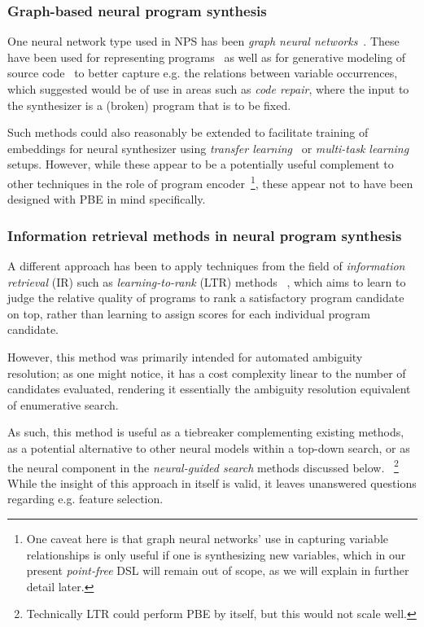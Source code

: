 \documentclass{article}
\begin{document}
\subsubsection{Graph-based neural program synthesis}

One neural network type used in NPS has been
\emph{graph neural networks}~\citep{shuman2013emerging,wu2020comprehensive}.
These have been used for representing programs~\citep{allamanis2017learning}
as well as for generative modeling of source code~\citep{brockschmidt2018generative}%
to better capture e.g. the relations between variable occurrences,
which \citet{brockschmidt2018generative} suggested would be of use in areas such as \emph{code repair},
where the input to the synthesizer is a (broken) program that is to be fixed.

Such methods could also reasonably be extended to facilitate training of embeddings for neural synthesizer using \emph{transfer learning}~\citep{pan2009survey} or \emph{multi-task learning}~\citep{multitasklearning} setups.
However, while these appear to be a potentially useful complement to other techniques
in the role of program encoder~\footnote{
    One caveat here is that graph neural networks' use in capturing
    variable relationships is only useful if one is synthesizing new variables,
    which in our present \emph{point-free} DSL will remain out of scope,
    as we will explain in further detail later.
}, these appear not to have been designed with PBE in mind specifically.

\subsubsection{Information retrieval methods in neural program synthesis}

A different approach has been to apply techniques from the field of
\emph{information retrieval} (IR) such as \emph{learning-to-rank} (LTR) methods%
~\citep{singh2015predicting}, which aims to learn to judge the
relative quality of programs to rank a satisfactory program candidate on top,
rather than learning to assign scores for each individual program candidate.

However, this method was primarily intended for automated ambiguity resolution;
as one might notice,
it has a cost complexity linear to the number of candidates evaluated,
rendering it essentially the ambiguity resolution equivalent of enumerative search.

As such, this method is useful as a tiebreaker complementing existing methods,
as a potential alternative to other neural models within a top-down search,
or as the neural component in the \emph{neural-guided search} methods discussed below.%
~\footnote{Technically LTR could perform PBE by itself, but this would not scale well.}
While the insight of this approach in itself is valid,
it leaves unanswered questions regarding e.g. feature selection.
\end{document}

